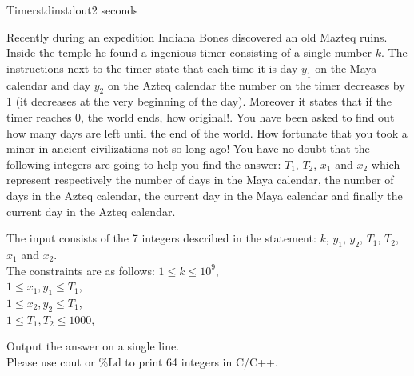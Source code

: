 \begin{problem}{Timer}{stdin}{stdout}{2 seconds}



Recently during an expedition Indiana Bones discovered an old Mazteq ruins. 
Inside the temple he found a ingenious timer consisting of a single number $k$.
The instructions next to the timer state that each time it is day $y_1$ on the Maya calendar and day $y_2$ on the Azteq calendar the number on the timer decreases by 1 (it decreases at the very beginning of the day). Moreover it states that if the timer reaches $0$, the world ends, how original!.
You have been asked to find out how many days are left until the end of the world.
How fortunate that you took a minor in ancient civilizations not so long ago! You have no doubt that the following integers are going to help you find the answer: $T_1$, $T_2$, $x_1$ and $x_2$ which represent respectively the number of days in the Maya calendar, the number of days in the Azteq calendar, the current day in the Maya calendar and finally the current day in the Azteq calendar.

\InputFile

The input consists of the 7 integers described in the statement: $k$, $y_1$, $y_2$, $T_1$, $T_2$, $x_1$ and $x_2$.\\ 
The constraints are as follows:
$1\le k \le 10^9$,\\ 
$1\le x_1,y_1 \le T_1$,\\ 
$1\le x_2,y_2 \le T_1$,\\ 
$1\le T_1,T_2 \le 1000$,\\ 


\OutputFile

Output the answer on a single line.\\ 
Please use cout or \%Ld to print 64 integers in C/C++.

\Example

\begin{examplewide}
%
\end{examplewide}

\end{problem}
